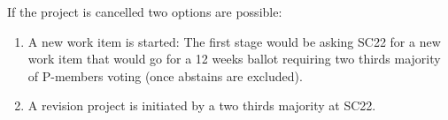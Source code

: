 \vspace{1em}
\begin{tcolorbox}[
  colback=red!8!white,
  colframe=red,
  title={\textbf{Impact}},
  breakable,
  width=\textwidth,
  boxrule=0.5pt
  ]
If the project is cancelled two options are possible:

\begin{enumerate}

\item A new work item is started: The first stage would be asking SC22 for a new
work item that would go for a 12 weeks ballot requiring two thirds majority of
P-members voting (once abstains are excluded).  

\item A revision project is initiated by a two thirds majority at SC22.

\end{enumerate}

\end{tcolorbox}
